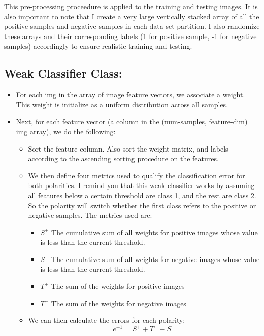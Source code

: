 \documentclass{article}
\begin{document}
This pre-processing proceedure is applied to the training and testing images. It is also important to note that I create a very large vertically stacked array of all the positive samples and negative samples in each data set partition. I also randomize these arrays and their corresponding labels (1 for positive sample, -1 for negative samples) accordingly to ensure realistic training and testing.

\subsection{Weak Classifier Class: }

\begin{itemize}
    \item For each img in the array of image feature vectors, we associate a weight. This weight is initialize as a uniform distribution across all samples.
    \item Next, for each feature vector (a column in the (num-samples, feature-dim) img array), we do the following:
        \begin{itemize}
            \item Sort the feature column. Also sort the weight matrix, and labels according to the ascending sorting procedure on the features.
            \item We then define four metrics used to qualify the classification error for both polarities. I remind you that this weak classifier works by assuming all features below a certain threshold are class 1, and the rest are class 2. So the polarity will switch whether the first class refers to the positive or negative samples. The metrics used are:
                \begin{itemize}
                    \item $S^+$ The cumulative sum of all weights for positive images whose value is less than the current threshold.
                    \item $S^-$ The cumulative sum of all weights for negative images whose value is less than the current threshold.
                    \item $T^+$ The sum of the weights for positive images
                    \item $T^-$ The sum of the weights for negative images
                \end{itemize}
            \item We can then calculate the errors for each polarity:
                \[ e^{+1} = S^+ + T^- - S^- \]

\end{itemize}
\end{itemize}
\end{document}
